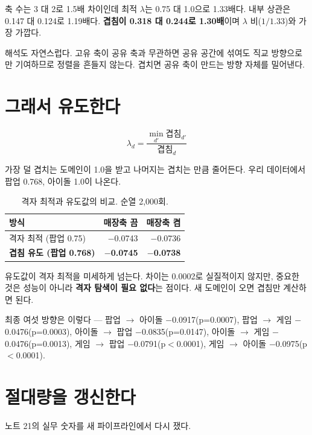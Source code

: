 \documentclass[10pt]{article}
\begin{document}
축 수는 3 대 2로 1.5배 차이인데 최적 $\lambda$는 0.75 대 1.0으로 1.33배다. 내부
상관은 0.147 대 0.124로 1.19배다. \textbf{겹침이 0.318 대 0.244로 1.30배}이며
$\lambda$ 비($1/1.33$)와 가장 가깝다.

해석도 자연스럽다. 고유 축이 공유 축과 무관하면 공유 공간에 섞여도 직교 방향으로만
기여하므로 정렬을 흔들지 않는다. 겹치면 공유 축이 만드는 방향 자체를 밀어낸다.

\section{그래서 유도한다}

\[
\lambda_d = \frac{\min_{d'} \text{겹침}_{d'}}{\text{겹침}_d}
\]

가장 덜 겹치는 도메인이 1.0을 받고 나머지는 겹치는 만큼 줄어든다. 우리 데이터에서
팝업 0.768, 아이돌 1.0이 나온다.

\begin{table}[t]
\centering\tsize
\caption{격자 최적과 유도값의 비교. 순열 2,000회.}
\begin{tabular}{lrr}
\toprule
방식 & 매장축 끔 & 매장축 켬 \\
\midrule
격자 최적 (팝업 0.75) & $-$0.0743 & $-$0.0736 \\
\textbf{겹침 유도 (팝업 0.768)} & \textbf{$-$0.0745} & \textbf{$-$0.0738} \\
\bottomrule
\end{tabular}
\end{table}

유도값이 격자 최적을 미세하게 넘는다. 차이는 0.0002로 실질적이지 않지만, 중요한
것은 성능이 아니라 \textbf{격자 탐색이 필요 없다}는 점이다. 새 도메인이 오면
겹침만 계산하면 된다.


최종 여섯 방향은 이렇다 --- 팝업 $\to$ 아이돌 $-$0.0917(p=0.0007), 팝업 $\to$ 게임
$-$0.0476(p=0.0003), 아이돌 $\to$ 팝업 $-$0.0835(p=0.0147), 아이돌 $\to$ 게임
$-$0.0476(p=0.0013), 게임 $\to$ 팝업 $-$0.0791(p$<$0.0001), 게임 $\to$ 아이돌
$-$0.0975(p$<$0.0001).

\section{절대량을 갱신한다}

노트 21의 실무 숫자를 새 파이프라인에서 다시 쟀다.
\end{document}
